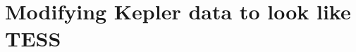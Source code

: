 \documentclass[a4paper,fleqn,usenatbib,useAMS]{mnras}
\begin{document}

\section{Modifying Kepler data to look like TESS}
\label{sect: tess-like}
\end{document}
